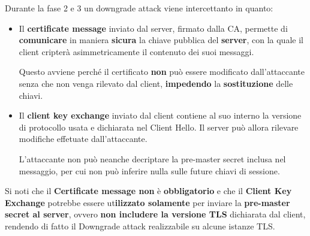 \begin{proposition}
Durante la fase 2 e 3 un downgrade attack viene intercettanto in quanto:
\begin{itemize}
    \item Il \textbf{certificate message} inviato dal server, firmato dalla CA, permette di \textbf{comunicare} in maniera \textbf{sicura} la chiave pubblica del \textbf{server}, con la quale il client cripterà asimmetricamente il contenuto dei suoi messaggi.\\
    \begin{remark}
    Questo avviene perché il certificato \textbf{non} può essere modificato dall'attaccante senza che non venga rilevato dal client, \textbf{impedendo} la \textbf{sostituzione} delle chiavi.
    \end{remark}
    \item Il \textbf{client key exchange} inviato dal client contiene al suo interno la versione di protocollo usata e dichiarata nel Client Hello. Il server può allora rilevare modifiche effetuate dall'attaccante.\\
    \begin{remark}
    L'attaccante non può neanche decriptare la pre-master secret inclusa nel messaggio, per cui non può inferire nulla sulle future chiavi di sessione.
    \end{remark}
\end{itemize}
\end{proposition}
\begin{remark}
Si noti che il \textbf{Certificate message non} è \textbf{obbligatorio} e che il \textbf{Client Key Exchange} potrebbe essere ut\textbf{ilizzato solamente} per inviare la \textbf{pre-master secret al server}, ovvero \textbf{non includere la versione TLS} dichiarata dal client, rendendo di fatto il Downgrade attack realizzabile su alcune istanze TLS.
\end{remark}
